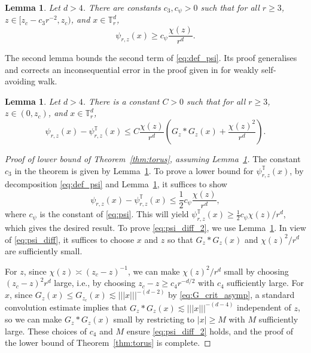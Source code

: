 \documentclass[11pt,hidelinks]{article}
\theoremstyle{plain}
\newtheorem{lemma}[theorem]{Lemma}
\numberwithin{equation}{section}
\newcommand{\ie}{i.e.}
\newcommand{\T}{\mathbb{T}}
\newcommand{\inv}{^{-1}}
\renewcommand{\(}{\left(}
\renewcommand{\)}{\right)}
\newcommand{\half}{\frac{1}{2}}
\newcommand{\1}{\mathds{1}}
\providecommand{\abs}[1]{\lvert#1\rvert}
\newcommand{\supT}{^{ \mathbb{T} }}
\newcommand{\subrz}{_{r,z}}
\newcommand{\veee}[1]{|\!|\!|#1|\!|\!|}
\providecommand{\nnnorm}[1]{\veee {#1} }
\newcommand{\crit}{_{z_c}}
\begin{document}
\begin{lemma} 
\label{lem:psi_lb}
Let $d>4$. 
There are constants $c_3, c_\psi > 0$ such that 
for all $r\ge 3$, $z \in [z_c - c_3r^{-2}, z_c )$, and $x\in \T^d_r$,
\begin{equation} \label{eq:psi}
\psi\subrz(x)  \ge  c_\psi \frac{ \chi(z) }{r^d }.
\end{equation}
\end{lemma}



The second lemma bounds the second term of \eqref{eq:def_psi}. 
Its proof generalises and corrects an inconsequential error in the proof given in \cite{Slad23_wsaw} for weakly self-avoiding walk.

\begin{lemma}
\label{lem:psi_diff}
Let $d>4$. 
There is a constant $C>0$ such that 
for all $r\ge 3$, $z \in (0, z_c)$, and $x\in \T^d_r$,
\begin{equation} \label{eq:psi_diff}
\psi\subrz(x) - \psi\subrz\supT(x) 
\le C \frac{ \chi(z) }{r^d } \( G_z*G_z(x) + \frac{ \chi(z)^2 }{r^d} \).
\end{equation}
\end{lemma}


\begin{proof}[Proof of lower bound of Theorem~\ref{thm:torus}, assuming Lemma~\ref{lem:psi_diff}]
The constant $c_3$ in the theorem is given by Lemma~\ref{lem:psi_lb}. To prove a lower bound for $\psi\subrz\supT(x)$, by decomposition \eqref{eq:def_psi} and Lemma~\ref{lem:psi_lb}, it suffices to show 
\begin{equation} \label{eq:psi_diff_2}
\psi\subrz(x) - \psi\subrz\supT(x) \le \half c_\psi \frac{ \chi(z) } {r^d},
\end{equation} 
where $c_\psi$ is the constant of \eqref{eq:psi}. 
This will yield $\psi\subrz\supT(x) \ge \half c_\psi \chi(z) / r^d$, which gives the desired result. 
To prove \eqref{eq:psi_diff_2}, we use Lemma~\ref{lem:psi_diff}. 
In view of \eqref{eq:psi_diff}, it suffices to choose $x$ and $z$ so that 
$G_z*G_z(x)$ and  ${ \chi(z)^2 } / {r^d}$ are sufficiently small. 

For $z$, since $\chi(z)\asymp (z_c-z)\inv$, 
we can make ${ \chi(z)^2 } / {r^d}$ small by choosing $(z_c-z)^2 r^d$ large, \ie, by choosing $z_c - z \ge c_4 r^{-d/2}$ with $c_4$ sufficiently large. 
For $x$, since $G_z(x) \le G\crit (x) \lesssim \nnnorm x^{-(d-2)}$ by \eqref{eq:G_crit_asymp}, a standard convolution estimate \cite[Proposition~1.7(i)]{HHS03} implies that $G_z*G_z(x) \lesssim \nnnorm x^{-(d-4)}$ independent of $z$,
so we can make $G_z*G_z(x)$ small by restricting to $\abs x \ge M$ with $M$ sufficiently large. 
These choices of $c_4$ and $M$ ensure \eqref{eq:psi_diff_2} holds, and the proof of the lower bound of Theorem~\ref{thm:torus} is complete.
\end{proof}
\end{document}
